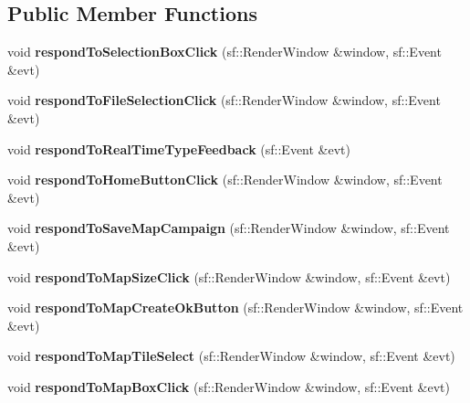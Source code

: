 \subsection*{Public Member Functions}
\begin{DoxyCompactItemize}
\item 
\hypertarget{class_events_ab0dbd88005439fb18106bc8f35437309}{}\label{class_events_ab0dbd88005439fb18106bc8f35437309} 
void {\bfseries respond\+To\+Selection\+Box\+Click} (sf\+::\+Render\+Window \&window, sf\+::\+Event \&evt)
\item 
\hypertarget{class_events_a7ee57b24ca4a83d2152926e786ebe308}{}\label{class_events_a7ee57b24ca4a83d2152926e786ebe308} 
void {\bfseries respond\+To\+File\+Selection\+Click} (sf\+::\+Render\+Window \&window, sf\+::\+Event \&evt)
\item 
\hypertarget{class_events_a0bdec91904043a57c7ef054af84944ad}{}\label{class_events_a0bdec91904043a57c7ef054af84944ad} 
void {\bfseries respond\+To\+Real\+Time\+Type\+Feedback} (sf\+::\+Event \&evt)
\item 
\hypertarget{class_events_a6814a65b6687e52e35d65434ea888da5}{}\label{class_events_a6814a65b6687e52e35d65434ea888da5} 
void {\bfseries respond\+To\+Home\+Button\+Click} (sf\+::\+Render\+Window \&window, sf\+::\+Event \&evt)
\item 
\hypertarget{class_events_a8938e3043e06ddd644c5190438cacf79}{}\label{class_events_a8938e3043e06ddd644c5190438cacf79} 
void {\bfseries respond\+To\+Save\+Map\+Campaign} (sf\+::\+Render\+Window \&window, sf\+::\+Event \&evt)
\item 
\hypertarget{class_events_a5196b88adc35339e62df1dfe24138bbe}{}\label{class_events_a5196b88adc35339e62df1dfe24138bbe} 
void {\bfseries respond\+To\+Map\+Size\+Click} (sf\+::\+Render\+Window \&window, sf\+::\+Event \&evt)
\item 
\hypertarget{class_events_a8e3d7cc6c9a59c1148667eafd1b8a557}{}\label{class_events_a8e3d7cc6c9a59c1148667eafd1b8a557} 
void {\bfseries respond\+To\+Map\+Create\+Ok\+Button} (sf\+::\+Render\+Window \&window, sf\+::\+Event \&evt)
\item 
\hypertarget{class_events_a3fab1a1842535111ec5e6754228ad1d4}{}\label{class_events_a3fab1a1842535111ec5e6754228ad1d4} 
void {\bfseries respond\+To\+Map\+Tile\+Select} (sf\+::\+Render\+Window \&window, sf\+::\+Event \&evt)
\item 
\hypertarget{class_events_a5f68f597c4e289079fe32565aadce713}{}\label{class_events_a5f68f597c4e289079fe32565aadce713} 
void {\bfseries respond\+To\+Map\+Box\+Click} (sf\+::\+Render\+Window \&window, sf\+::\+Event \&evt)

\end{DoxyCompactItemize}
